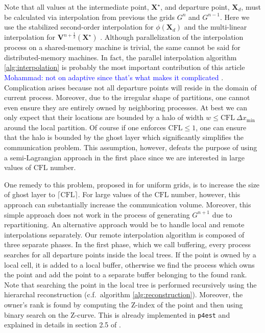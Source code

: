 Note that all values at the intermediate point, $\mathbf{X}^\star$, and departure point, $\mathbf{X}_d$, must be calculated via interpolation from previous the grids $G^{n}$ and $G^{n-1}$. Here we use the stabilized second-order interpolation for $\phi(\mathbf{X}_d)$ and the multi-linear interpolation for $\mathbf{V}^{n+\frac{1}{2}}(\mathbf{X}^\star)$ \cite{Min;Gibou:07:A-second-order-accur}. Although parallelization of the interpolation process on a shared-memory machine is trivial, the same cannot be said for distributed-memory machines. In fact, the parallel interpolation algorithm \ref{alg:interpolation} is probably the most important contribution of this article  \textcolor{blue}{Mohammad: not on adaptive since that's what makes it complicated} . Complication arises because not all departure points will reside in the domain of current process. Moreover, due to the irregular shape of partitions, one cannot even ensure they are entirely owned by neighboring processes. At best we can only expect that their locations are bounded by a halo of width $w \le \text{CFL} \: \Delta x_{\min}$ around the local partition. Of course if one enforces $\text{CFL} \le 1$, one can ensure that the halo is bounded by the ghost layer which significantly simplifies the communication problem. This assumption, however, defeats the purpose of using a semi-Lagrangian approach in the first place since we are interested in large values of $\text{CFL}$ number.

One remedy to this problem, proposed in \cite{Thomas;Cote:95:Massively-parallel-s} for uniform grids, is to increase the size of ghost layer to $\lceil \text{CFL} \rceil$. For large values of the $\text{CFL}$ number, however, this approach can substantially increase the communication volume. Moreover, this simple approach does not work in the process of generating $G^{n+1}$ due to repartitioning. An alternative approach would be to handle local and remote interpolations separately. Our remote interpolation algorithm is composed of three separate phases. In the first phase, which we call buffering, every process searches for all departure points inside the local trees. If the point is owned by a local cell, it is added to a local buffer, otherwise we find the process which owns the point and add the point to a separate buffer belonging to the found rank. Note that searching the point in the local tree is performed recursively using the hierarchal reconstruction (c.f.\ algorithm \ref{alg:reconstruction}). Moreover, the owner's rank is found by computing the Z-index of the point and then using binary search on the Z-curve. This is already implemented in \texttt{p4est} and explained in details in section 2.5 of \cite{Burstedde;Wilcox;Ghattas:11:p4est:-Scalable-Algo}.

